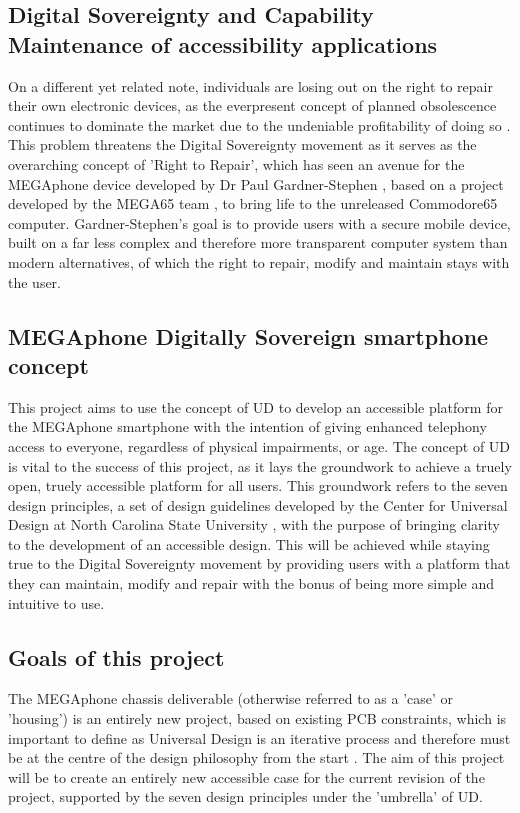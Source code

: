 \subsection{Digital Sovereignty and Capability Maintenance of accessibility applications} %
On a different yet related note, individuals are losing out on the right to repair their own electronic devices, as the everpresent concept of planned obsolescence continues to dominate the market due to the undeniable profitability of doing so \cite{obsolescence2}.
This problem threatens the Digital Sovereignty movement as it serves as the overarching concept of 'Right to Repair', which has seen an avenue for the MEGAphone device developed by Dr Paul Gardner-Stephen \cite{mobilehistory}, based on a project developed by the MEGA65 team \cite{mega65}, to bring life to the unreleased Commodore65 computer. %
Gardner-Stephen's goal is to provide users with a secure mobile device, built on a far less complex and therefore more transparent computer system than modern alternatives, of which the right to repair, modify and maintain stays with the user.

\subsection{MEGAphone Digitally Sovereign smartphone concept}
This project aims to use the concept of UD to develop an accessible platform for the MEGAphone smartphone with the intention of giving enhanced telephony access to everyone, regardless of physical impairments, or age.
The concept of UD is vital to the success of this project, as it lays the groundwork to achieve a truely open, truely accessible platform for all users. 
This groundwork refers to the seven design principles, a set of design guidelines developed by the Center for Universal Design at North Carolina State University \cite{sevenprinciples}, with the purpose of bringing clarity to the development of an accessible design.
This will be achieved while staying true to the Digital Sovereignty movement by providing users with a platform that they can maintain, modify and repair with the bonus of being more simple and intuitive to use.

\subsection{Goals of this project}
The MEGAphone chassis deliverable (otherwise referred to as a 'case' or 'housing') is an entirely new project, based on existing PCB constraints, which is important to define as Universal Design is an iterative process and therefore must be at the centre of the design philosophy from the start \cite{incldesign}.
The aim of this project will be to create an entirely new accessible case for the current revision of the project, supported by the seven design principles under the 'umbrella' of UD.

